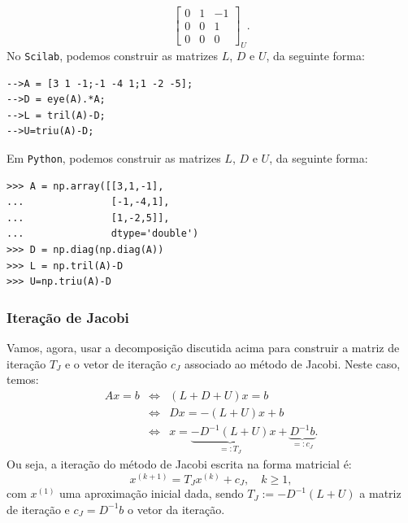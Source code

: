 \begin{sol}
\begin{equation}
{\begin{bmatrix}
    0 & 1 & -1\\
    0 & 0 & 1\\
    0 & 0 & 0
  \end{bmatrix}}_{U}.
\end{equation}
\ifisscilab
No \verb+Scilab+, podemos construir as matrizes $L$, $D$ e $U$, da seguinte forma:
\begin{verbatim}
-->A = [3 1 -1;-1 -4 1;1 -2 -5];
-->D = eye(A).*A;
-->L = tril(A)-D;
-->U=triu(A)-D;
\end{verbatim}
\fi
\ifispython
Em \verb+Python+, podemos construir as matrizes $L$, $D$ e $U$, da seguinte forma:
\begin{verbatim}
>>> A = np.array([[3,1,-1],
...               [-1,-4,1],
...               [1,-2,5]],
...               dtype='double')
>>> D = np.diag(np.diag(A))
>>> L = np.tril(A)-D
>>> U=np.triu(A)-D
\end{verbatim}
\fi
\end{sol}

\subsubsection{Iteração de Jacobi}

Vamos, agora, usar a decomposição discutida acima para construir a matriz de iteração $T_J$ e o vetor de iteração $c_J$ associado ao método de Jacobi. Neste caso, temos:
\begin{eqnarray}
  Ax = b &\Leftrightarrow& (L + D + U)x = b\\
  &\Leftrightarrow& Dx = -(L+U)x + b\\
  &\Leftrightarrow& x = \underbrace{-D^{-1}(L+U)}_{=: T_J}x + \underbrace{D^{-1}b}_{=: c_J}.
\end{eqnarray}
Ou seja, a iteração do método de Jacobi escrita na forma matricial é:
\begin{equation}
  x^{(k+1)} = T_Jx^{(k)} + c_J,\quad k\geq 1,
\end{equation}
com $x^{(1)}$ uma aproximação inicial dada, sendo $T_J := -D^{-1}(L+U)$ a matriz de iteração e $c_J = D^{-1}b$ o vetor da iteração.

